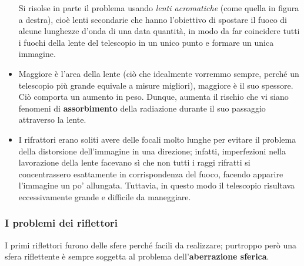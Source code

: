 \begin{itemize}
Si risolse in parte il problema usando \textit{lenti acromatiche} (come quella in figura a destra), cioè lenti secondarie che hanno l'obiettivo di spostare il fuoco di alcune lunghezze d'onda di una data quantità, in modo da far coincidere tutti i fuochi della lente del telescopio in un unico punto e formare un unica immagine.

\item Maggiore è l'area della lente (ciò che idealmente vorremmo sempre, perché un telescopio più grande equivale a misure migliori), maggiore è il suo spessore. Ciò comporta un aumento in peso. Dunque, aumenta il rischio che vi siano fenomeni di \textbf{assorbimento} della radiazione durante il suo passaggio attraverso la lente.

\item I rifrattori erano soliti avere delle focali molto lunghe per evitare il problema della distorsione dell'immagine in una direzione; infatti, imperfezioni nella lavorazione della lente facevano sì che non tutti i raggi rifratti si concentrassero esattamente in corrispondenza del fuoco, facendo apparire l'immagine un po' allungata. Tuttavia, in questo modo il telescopio risultava eccessivamente grande e difficile da maneggiare.
\end{itemize}

\subsubsection{I problemi dei riflettori}

I primi riflettori furono delle sfere perché facili da realizzare; purtroppo però una sfera riflettente è sempre soggetta al problema dell'\textbf{aberrazione sferica}.

